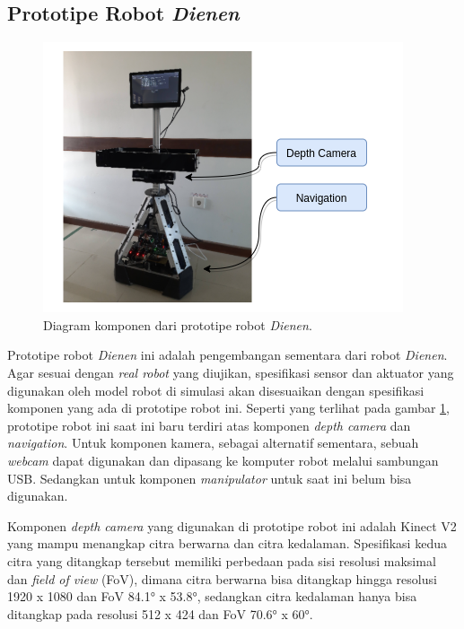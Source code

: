 \subsection{Prototipe Robot \emph{Dienen}}
\label{subsec:prototiperobotdienen}

\begin{figure}[ht]
  \centering
  \includegraphics[scale=0.5]{gambar/komponen-prototipe-robot.png}
  \caption{Diagram komponen dari prototipe robot \emph{Dienen}.}
  \label{fig:komponenprototiperobot}
\end{figure}

Prototipe robot \emph{Dienen} ini adalah pengembangan sementara dari robot \emph{Dienen}.
Agar sesuai dengan \emph{real robot} yang diujikan,
  spesifikasi sensor dan aktuator yang digunakan oleh model robot di simulasi akan disesuaikan dengan spesifikasi komponen yang ada di prototipe robot ini.
Seperti yang terlihat pada gambar \ref{fig:komponenprototiperobot},
  prototipe robot ini saat ini baru terdiri atas komponen \emph{depth camera} dan \emph{navigation}.
Untuk komponen kamera, sebagai alternatif sementara, sebuah \emph{webcam} dapat digunakan dan dipasang ke komputer robot melalui sambungan USB.
Sedangkan untuk komponen \emph{manipulator} untuk saat ini belum bisa digunakan.

Komponen \emph{depth camera} yang digunakan di prototipe robot ini adalah Kinect V2 yang mampu menangkap citra berwarna dan citra kedalaman.
Spesifikasi kedua citra yang ditangkap tersebut memiliki perbedaan pada sisi resolusi maksimal dan \emph{field of view} (FoV),
  dimana citra berwarna bisa ditangkap hingga resolusi 1920 x 1080 dan FoV 84.1° x 53.8°,
  sedangkan citra kedalaman hanya bisa ditangkap pada resolusi 512 x 424 dan FoV 70.6° x 60°.

